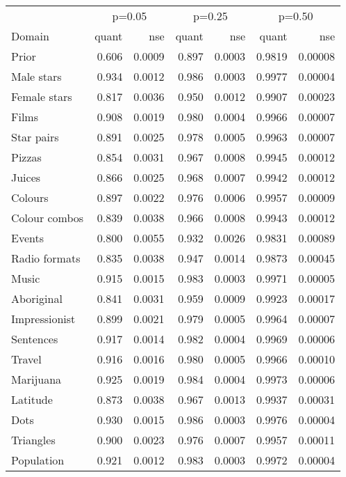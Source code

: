 
\begin{tabular}[t]{lrrrrrr}
\toprule
\multicolumn{1}{c}{ } & \multicolumn{2}{c}{p=0.05} & \multicolumn{2}{c}{p=0.25} & \multicolumn{2}{c}{p=0.50} \\
\cmidrule(l{3pt}r{3pt}){2-3} \cmidrule(l{3pt}r{3pt}){4-5} \cmidrule(l{3pt}r{3pt}){6-7}
Domain & quant & nse & quant & nse & quant & nse\\
\midrule
Prior & 0.606 & 0.0009 & 0.897 & 0.0003 & 0.9819 & 0.00008\\
Male stars & 0.934 & 0.0012 & 0.986 & 0.0003 & 0.9977 & 0.00004\\
Female stars & 0.817 & 0.0036 & 0.950 & 0.0012 & 0.9907 & 0.00023\\
Films & 0.908 & 0.0019 & 0.980 & 0.0004 & 0.9966 & 0.00007\\
Star pairs & 0.891 & 0.0025 & 0.978 & 0.0005 & 0.9963 & 0.00007\\
\addlinespace
Pizzas & 0.854 & 0.0031 & 0.967 & 0.0008 & 0.9945 & 0.00012\\
Juices & 0.866 & 0.0025 & 0.968 & 0.0007 & 0.9942 & 0.00012\\
Colours & 0.897 & 0.0022 & 0.976 & 0.0006 & 0.9957 & 0.00009\\
Colour combos & 0.839 & 0.0038 & 0.966 & 0.0008 & 0.9943 & 0.00012\\
Events & 0.800 & 0.0055 & 0.932 & 0.0026 & 0.9831 & 0.00089\\
\addlinespace
Radio formats & 0.835 & 0.0038 & 0.947 & 0.0014 & 0.9873 & 0.00045\\
Music & 0.915 & 0.0015 & 0.983 & 0.0003 & 0.9971 & 0.00005\\
Aboriginal & 0.841 & 0.0031 & 0.959 & 0.0009 & 0.9923 & 0.00017\\
Impressionist & 0.899 & 0.0021 & 0.979 & 0.0005 & 0.9964 & 0.00007\\
Sentences & 0.917 & 0.0014 & 0.982 & 0.0004 & 0.9969 & 0.00006\\
\addlinespace
Travel & 0.916 & 0.0016 & 0.980 & 0.0005 & 0.9966 & 0.00010\\
Marijuana & 0.925 & 0.0019 & 0.984 & 0.0004 & 0.9973 & 0.00006\\
Latitude & 0.873 & 0.0038 & 0.967 & 0.0013 & 0.9937 & 0.00031\\
Dots & 0.930 & 0.0015 & 0.986 & 0.0003 & 0.9976 & 0.00004\\
Triangles & 0.900 & 0.0023 & 0.976 & 0.0007 & 0.9957 & 0.00011\\
\addlinespace
Population & 0.921 & 0.0012 & 0.983 & 0.0003 & 0.9972 & 0.00004\\

\end{tabular}

